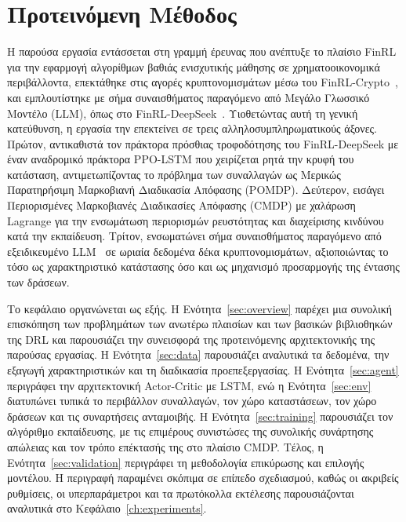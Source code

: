 
\chapter{Προτεινόμενη Μέθοδος}
\label{ch:method}

Η παρούσα εργασία εντάσσεται στη γραμμή έρευνας που ανέπτυξε το πλαίσιο
FinRL~\cite{liu2018finrl} για την εφαρμογή αλγορίθμων βαθιάς ενισχυτικής μάθησης
σε χρηματοοικονομικά περιβάλλοντα, επεκτάθηκε στις αγορές κρυπτονομισμάτων
μέσω του FinRL-Crypto~\cite{gort2022finrlcrypto}, και εμπλουτίστηκε με σήμα συναισθήματος
παραγόμενο από Μεγάλο Γλωσσικό Μοντέλο (LLM), όπως στο
FinRL-DeepSeek~\cite{benhenda2025finrldeepseek}. Υιοθετώντας αυτή τη γενική κατεύθυνση, η εργασία
την επεκτείνει σε τρεις αλληλοσυμπληρωματικούς άξονες. Πρώτον, αντικαθιστά
τον πράκτορα πρόσθιας τροφοδότησης του FinRL-DeepSeek με έναν αναδρομικό
πράκτορα PPO-LSTM που χειρίζεται ρητά την κρυφή του κατάσταση,
αντιμετωπίζοντας το πρόβλημα των συναλλαγών ως Μερικώς Παρατηρήσιμη
Μαρκοβιανή Διαδικασία Απόφασης (POMDP). Δεύτερον, εισάγει Περιορισμένες
Μαρκοβιανές Διαδικασίες Απόφασης (CMDP) με χαλάρωση Lagrange για την
ενσωμάτωση περιορισμών ρευστότητας και διαχείρισης κινδύνου κατά την
εκπαίδευση. Τρίτον, ενσωματώνει σήμα συναισθήματος παραγόμενο από
εξειδικευμένο LLM~\cite{yang2023fingpt} σε ωριαία δεδομένα δέκα κρυπτονομισμάτων,
αξιοποιώντας το τόσο ως χαρακτηριστικό κατάστασης όσο και ως μηχανισμό
προσαρμογής της έντασης των δράσεων.

Το κεφάλαιο οργανώνεται ως εξής. Η Ενότητα~\ref{sec:overview} παρέχει μια
συνολική επισκόπηση των προβλημάτων των ανωτέρω πλαισίων και των βασικών βιβλιοθηκών της DRL
και παρουσιάζει την συνεισφορά της προτεινόμενης αρχιτεκτονικής της παρούσας εργασίας. 
Η Ενότητα~\ref{sec:data} παρουσιάζει 
αναλυτικά τα δεδομένα, την εξαγωγή χαρακτηριστικών και τη διαδικασία
προεπεξεργασίας. Η Ενότητα~\ref{sec:agent} περιγράφει την αρχιτεκτονική
Actor-Critic με LSTM, ενώ η Ενότητα~\ref{sec:env} διατυπώνει τυπικά το
περιβάλλον συναλλαγών, τον χώρο καταστάσεων, τον χώρο δράσεων και τις
συναρτήσεις ανταμοιβής. Η Ενότητα~\ref{sec:training} παρουσιάζει τον
αλγόριθμο εκπαίδευσης, με τις επιμέρους συνιστώσες της συνολικής συνάρτησης
απώλειας και τον τρόπο επέκτασής της στο πλαίσιο CMDP. Τέλος, η
Ενότητα~\ref{sec:validation} περιγράφει τη μεθοδολογία επικύρωσης και
επιλογής μοντέλου. Η περιγραφή παραμένει σκόπιμα σε επίπεδο σχεδιασμού, καθώς οι
ακριβείς ρυθμίσεις, οι υπερπαράμετροι και τα πρωτόκολλα εκτέλεσης
παρουσιάζονται αναλυτικά στο Κεφάλαιο~\ref{ch:experiments}.


